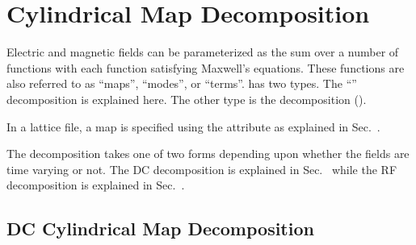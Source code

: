 \section{Cylindrical Map Decomposition}
\label{s:cylind.map.phys}

Electric and magnetic fields can be parameterized as the sum over a number of functions with each
function satisfying Maxwell's equations. These functions are also referred to as ``maps'',
``modes'', or ``terms''. \bmad has two types. The ``'' decomposition is explained
here. The other type is the  decomposition ().

In a lattice file, a  map is specified using the  attribute as
explained in Sec.~.

The  decomposition takes one of two forms depending upon whether the fields are time
varying or not. The DC decomposition is explained in Sec.~ while the RF
decomposition is explained in Sec.~.

\subsection{DC Cylindrical Map Decomposition}
\label{s:cylind.dc}

